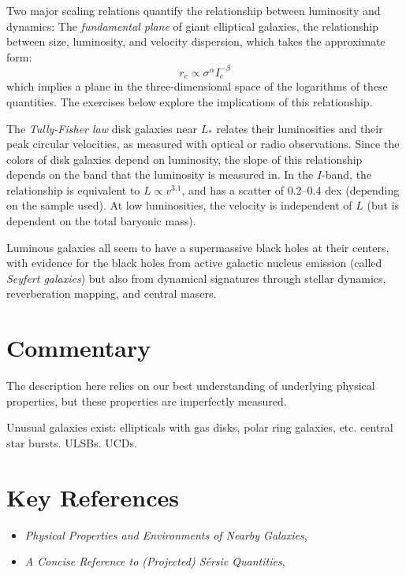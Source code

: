 Two major scaling relations quantify the relationship between
luminosity and dynamics: The {\it fundamental plane} of giant
elliptical galaxies, the relationship between size, luminosity, and
velocity dispersion, which takes the approximate form:
\begin{equation}
\label{eq:fundamentalplane}
r_e \propto \sigma^\alpha I_e^{-\beta}
\end{equation}
which implies a plane in the three-dimensional space of the logarithms
of these quantities. The exercises below explore the implications of
this relationship.

The {\it Tully-Fisher law} disk galaxies near $L_\ast$ relates their
luminosities and their peak circular velocities, as measured with
optical or radio observations. Since the colors of disk galaxies
depend on luminosity, the slope of this relationship depends on the
band that the luminosity is measured in. In the $I$-band, the
relationship is equivalent to $L\propto v^{3.1}$, and has a scatter of
0.2--0.4 dex (depending on the sample used). At low luminosities, the
velocity is independent of $L$ (but is dependent on the total baryonic
mass).

Luminous galaxies all seem to have a supermassive black holes at their
centers, with evidence for the black holes from active galactic
nucleus emission (called {\it Seyfert galaxies}) but also from
dynamical signatures through stellar dynamics, reverberation mapping,
and central masers.

\section{Commentary}

The description here relies on our best understanding of underlying
physical properties, but these properties are imperfectly measured.

Unusual galaxies exist: ellipticals with gas disks, polar ring
galaxies, etc. central star bursts. ULSBs. UCDs.

\section{Key References}

\begin{itemize}
\item {\it Physical Properties and Environments of Nearby
Galaxies}, \citet{blanton09a}
\item {\it A Concise Reference to (Projected) S{\'e}rsic
Quantities}, \citet{Graham:2005p2523}
\end{itemize}

